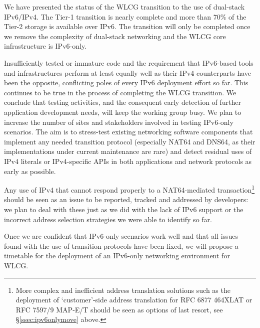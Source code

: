 
We have presented the status of the WLCG transition to the use of dual-stack IPv6/IPv4. The Tier-1 transition is nearly complete and 
more than 70\% of the Tier-2 storage is available over IPv6. The transition will only be completed once we remove the complexity of
dual-stack networking and the WLCG core infrastructure is IPv6-only.


Insufficiently tested or immature code and the requirement that IPv6-based
tools and infrastructures perform at least equally well as their IPv4
counterparts have been the opposite, conflicting poles of every IPv6
deployment effort so far. This continues to be true in the process
of completing the WLCG transition. We conclude that
testing activities, and the consequent early detection of further application
development needs, will keep the working group busy. We plan
to increase the number of sites and stakeholders involved in testing IPv6-only 
scenarios. The aim is to stress-test existing networking software components
that implement any needed transition protocol (especially NAT64 and DNS64, as 
their implementations under current maintenance are rare) and detect
residual uses of IPv4 literals or IPv4-specific APIs in both applications and
network protocols as early as possible.\par
Any use of IPv4 that cannot respond properly to a NAT64-mediated
transaction\footnote{More complex and inefficient address
translation solutions such as the deployment of `customer'-side address
translation for RFC 6877 \cite{rfc} 464XLAT or RFC 7597/9 MAP-E/T  should be
seen as options of last resort, see \S \ref{ssec:ipv6onlymove} above.}
should be seen as an issue to be reported, tracked and
addressed by developers: we plan to deal with these just as we did
with the lack of IPv6 support or the incorrect address selection
strategies we were able to identify so far.\par
Once we are confident that IPv6-only scenarios work well and that
all issues found with the use of transition protocols have been fixed, we will
propose a timetable for the deployment of an IPv6-only networking 
environment for WLCG.

